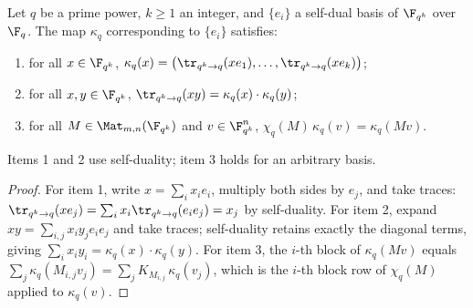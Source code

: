 \begin{lemma}\label{lem:downsize_field}
	\leanok
	Let $q$ be a prime power, $k \ge 1$ an integer, and $\{e_i\}$ a self-dual
	basis of $\F_{q^k}$ over $\F_q$. The map $\kappa_q$ corresponding to
	$\{e_i\}$ satisfies:
	\begin{enumerate}
		\item for all $x \in \F_{q^k}$,
		      $\kappa_q(x) = \bigl(\tr_{q^k \to q}(x e_1), \dots,
		      \tr_{q^k \to q}(x e_k)\bigr)$;
		\item for all $x, y \in \F_{q^k}$,
		      $\tr_{q^k \to q}(xy) = \kappa_q(x) \cdot \kappa_q(y)$;
		\item for all $M \in \Mat_{m,n}(\F_{q^k})$ and $v \in \F_{q^k}^n$,
		      $\chi_q(M)\, \kappa_q(v) = \kappa_q(Mv)$.
	\end{enumerate}
	Items 1 and 2 use self-duality; item 3 holds for an arbitrary basis.
\end{lemma}
\begin{proof}
	\leanok
	For item 1, write $x = \sum_i x_i e_i$, multiply both sides by $e_j$, and
	take traces: $\tr_{q^k \to q}(x e_j) = \sum_i x_i \tr_{q^k \to q}(e_i e_j)
	= x_j$ by self-duality. For item 2, expand
	$xy = \sum_{i,j} x_i y_j e_i e_j$ and take traces; self-duality retains
	exactly the diagonal terms, giving $\sum_i x_i y_i = \kappa_q(x) \cdot
	\kappa_q(y)$. For item 3, the $i$-th block of $\kappa_q(Mv)$ equals
	$\sum_j \kappa_q(M_{i,j} v_j) = \sum_j K_{M_{i,j}}\, \kappa_q(v_j)$, which
	is the $i$-th block row of $\chi_q(M)$ applied to $\kappa_q(v)$.
\end{proof}

